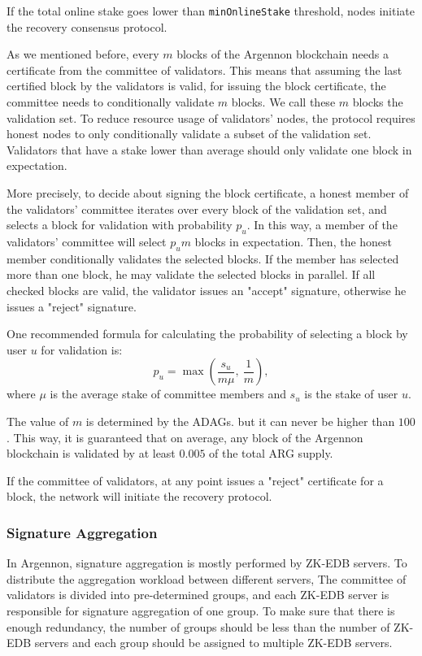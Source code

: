 If the total online stake goes lower than \texttt{minOnlineStake} threshold, nodes initiate the recovery
consensus protocol.

As we mentioned before, every $m$ blocks of the Argennon blockchain needs a certificate from the committee
of validators. This means that assuming the last certified block by the validators is valid, for issuing the block
certificate, the committee needs to conditionally validate $m$ blocks. We call these $m$ blocks the
validation set. To reduce resource usage of validators' nodes, the protocol requires honest nodes to only
conditionally validate a subset of the validation set. Validators that have a stake lower than
average should only validate one block in expectation.

More precisely, to decide about signing the block certificate, a honest member of the validators'
committee iterates over every block of the validation set, and selects a block for validation with
probability $p_u$. In this way, a member of the validators' committee will select $p_{u}m$ blocks in expectation.
Then, the honest member conditionally validates the selected blocks. If the member has selected more than one block,
he may validate the selected blocks in parallel.
If all checked blocks are valid, the validator issues an "accept"
signature, otherwise he issues a "reject" signature.

One recommended formula for calculating the probability of selecting a block by user $u$ for validation is:
\begin{equation}
    p_u=\max\left(\frac{s_u}{m\mu},\ \frac{1}{m}\right),\label{eq:block-selection}
\end{equation}
where $\mu$ is the average stake of committee members and $s_u$ is the stake of user $u$.

The value of $m$ is determined by the ADAGs. but it can never be higher than $100$. This way, it is guaranteed
that on average, any block of the Argennon blockchain is validated by at least $0.005$ of the total ARG supply.

If the committee of validators, at any point issues a "reject" certificate for a block, the network will initiate the
recovery protocol.

\subsubsection{Signature Aggregation}

In Argennon, signature aggregation is mostly performed by ZK-EDB servers. To distribute the aggregation workload
between different servers, The committee of validators is divided into pre-determined groups, and each ZK-EDB
server is responsible for signature aggregation of one group. To make sure that there is enough redundancy, the number
of groups should be less than the number of ZK-EDB servers and each group should be assigned to
multiple ZK-EDB servers.

